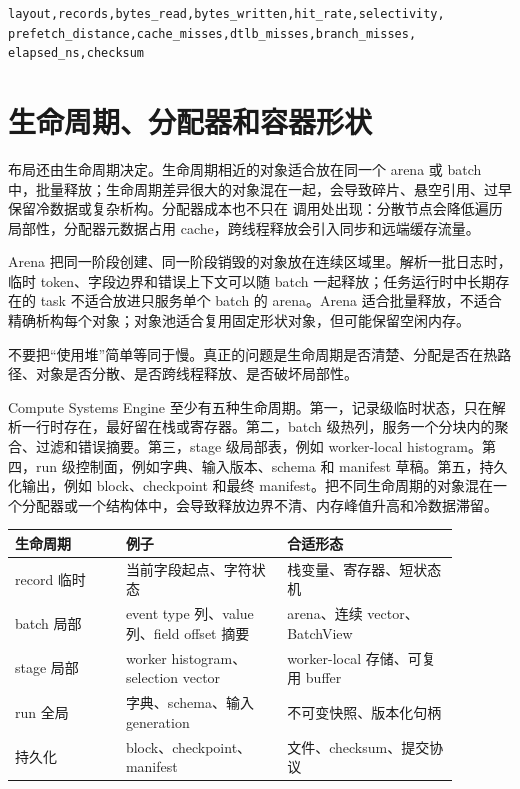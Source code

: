 \begin{lstlisting}[numbers=none,caption={预取实验应记录的字段}]
layout,records,bytes_read,bytes_written,hit_rate,selectivity,
prefetch_distance,cache_misses,dtlb_misses,branch_misses,
elapsed_ns,checksum
\end{lstlisting}

\section{生命周期、分配器和容器形状}

布局还由生命周期决定。生命周期相近的对象适合放在同一个 arena 或 batch 中，批量释放；生命周期差异很大的对象混在一起，会导致碎片、悬空引用、过早保留冷数据或复杂析构。分配器成本也不只在  调用处出现：分散节点会降低遍历局部性，分配器元数据占用 cache，跨线程释放会引入同步和远端缓存流量。

Arena 把同一阶段创建、同一阶段销毁的对象放在连续区域里。解析一批日志时，临时 token、字段边界和错误上下文可以随 batch 一起释放；任务运行时中长期存在的 task 不适合放进只服务单个 batch 的 arena。Arena 适合批量释放，不适合精确析构每个对象；对象池适合复用固定形状对象，但可能保留空闲内存。

\begin{warningbox}
不要把“使用堆”简单等同于慢。真正的问题是生命周期是否清楚、分配是否在热路径、对象是否分散、是否跨线程释放、是否破坏局部性。
\end{warningbox}

Compute Systems Engine 至少有五种生命周期。第一，记录级临时状态，只在解析一行时存在，最好留在栈或寄存器。第二，batch 级热列，服务一个分块内的聚合、过滤和错误摘要。第三，stage 级局部表，例如 worker-local histogram。第四，run 级控制面，例如字典、输入版本、schema 和 manifest 草稿。第五，持久化输出，例如 block、checkpoint 和最终 manifest。把不同生命周期的对象混在一个分配器或一个结构体中，会导致释放边界不清、内存峰值升高和冷数据滞留。

\begin{center}
\begin{tabular}{p{0.22\linewidth}p{0.32\linewidth}p{0.34\linewidth}}
\toprule
生命周期 & 例子 & 合适形态 \\
\midrule
record 临时 & 当前字段起点、字符状态 & 栈变量、寄存器、短状态机 \\
batch 局部 & event type 列、value 列、field offset 摘要 & arena、连续 vector、BatchView \\
stage 局部 & worker histogram、selection vector & worker-local 存储、可复用 buffer \\
run 全局 & 字典、schema、输入 generation & 不可变快照、版本化句柄 \\
持久化 & block、checkpoint、manifest & 文件、checksum、提交协议 \\
\bottomrule
\end{tabular}
\end{center}

